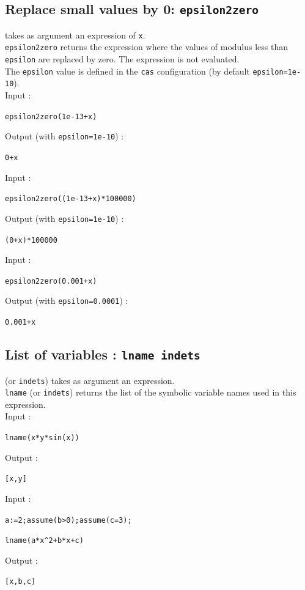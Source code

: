 \documentclass[a4paper,11pt]{book}
\begin{document}
\subsection{Replace small values by 0: {\tt epsilon2zero}}
 \label{sec:epsilon2zero}
 takes as argument an expression of {\tt x}.\\
{\tt epsilon2zero} returns the expression where the values of modulus
less than  {\tt epsilon} are replaced by zero. The expression
is not evaluated.\\
The {\tt epsilon} value is defined in the {\tt cas} 
configuration (by default {\tt epsilon=1e-10}).\\
Input :
\begin{center}{\tt epsilon2zero(1e-13+x) }\end{center}
Output (with {\tt epsilon=1e-10}) :
\begin{center}{\tt 0+x}\end{center}
Input :
\begin{center}{\tt epsilon2zero((1e-13+x)*100000) }\end{center}
Output (with {\tt epsilon=1e-10}) :
\begin{center}{\tt (0+x)*100000}\end{center}
Input :
\begin{center}{\tt epsilon2zero(0.001+x) }\end{center}
Output (with {\tt epsilon=0.0001}) :
\begin{center}{\tt 0.001+x}\end{center}

\subsection{List of variables : {\tt lname indets}}
 (or {\tt indets}) takes as argument an expression.\\
{\tt lname} (or {\tt indets}) returns the list of the symbolic
variable names used in this expression.\\
Input :
\begin{center}{\tt lname(x*y*sin(x))}\end{center}
Output :
\begin{center}{\tt  [x,y]}\end{center}
Input :
\begin{center}{\tt a:=2;assume(b>0);assume(c=3);}\end{center}
\begin{center}{\tt lname(a*x\verb|^|2+b*x+c)}\end{center}
Output :
\begin{center}{\tt  [x,b,c]}\end{center}
\end{document}
